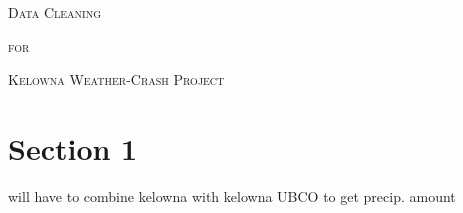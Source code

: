 \documentclass[11pt, a4paper]{article}
\begin{document}


\begin{center}
\Large{\textsc{Data Cleaning}}
\par
\normalsize{\textsc{for}}
\par
\large{\textsc{Kelowna Weather-Crash Project}}
\end{center}


\vspace{0.917 pc} %

\section*{Section 1}


will have to combine kelowna with kelowna UBCO to get precip. amount
\end{document}
